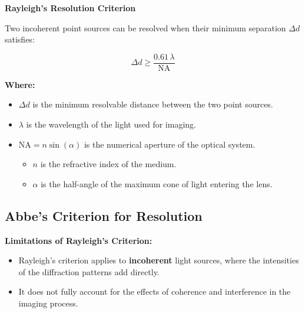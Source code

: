 \documentclass[
  a4paper,
]{book}
\providecommand{\tightlist}{%
  \setlength{\itemsep}{0pt}\setlength{\parskip}{0pt}}
\begin{document}
\begin{tcolorbox}[enhanced jigsaw, breakable, toptitle=1mm, bottomrule=.15mm, colbacktitle=quarto-callout-note-color!10!white, title=\textcolor{quarto-callout-note-color}{\faInfo}\hspace{0.5em}{Note}, arc=.35mm, rightrule=.15mm, bottomtitle=1mm, opacityback=0, toprule=.15mm, coltitle=black, leftrule=.75mm, opacitybacktitle=0.6, colback=white, left=2mm, titlerule=0mm, colframe=quarto-callout-note-color-frame]

\textbf{Rayleigh's Resolution Criterion}

Two incoherent point sources can be resolved when their minimum
separation \(\Delta d\) satisfies:

\[
\Delta d \geq \frac{0.61\, \lambda}{\text{NA}}
\]

\textbf{Where:}

\begin{itemize}
\tightlist
\item
  \(\Delta d\) is the minimum resolvable distance between the two point
  sources.
\item
  \(\lambda\) is the wavelength of the light used for imaging.
\item
  \(\text{NA} = n \sin(\alpha)\) is the numerical aperture of the
  optical system.

  \begin{itemize}
  \tightlist
  \item
    \(n\) is the refractive index of the medium.
  \item
    \(\alpha\) is the half-angle of the maximum cone of light entering
    the lens.
  \end{itemize}
\end{itemize}

\end{tcolorbox}

\subsection{Abbe's Criterion for
Resolution}\label{abbes-criterion-for-resolution}

\textbf{Limitations of Rayleigh's Criterion:}

\begin{itemize}
\tightlist
\item
  Rayleigh's criterion applies to \textbf{incoherent} light sources,
  where the intensities of the diffraction patterns add directly.
\item
  It does not fully account for the effects of coherence and
  interference in the imaging process.
\end{itemize}
\end{document}
